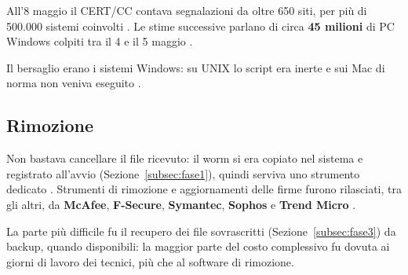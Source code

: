 All'8 maggio il CERT/CC contava segnalazioni da oltre 650 siti, per più di 500.000 sistemi coinvolti \cite{cert2000}. Le stime successive parlano di circa \textbf{45 milioni} di PC Windows colpiti tra il 4 e il 5 maggio \cite{bbc2010}.

Il bersaglio erano i sistemi Windows: su UNIX lo script era inerte e sui Mac di norma non veniva eseguito \cite{bishop2000}.

\subsection{Rimozione}

Non bastava cancellare il file ricevuto: il worm si era copiato nel sistema e registrato all'avvio (Sezione~\ref{subsec:fase1}), quindi serviva uno strumento dedicato \cite{markoff2000, bishop2000}. Strumenti di rimozione e aggiornamenti delle firme furono rilasciati, tra gli altri, da \textbf{McAfee}, \textbf{F-Secure}, \textbf{Symantec}, \textbf{Sophos} e \textbf{Trend Micro} \cite{cert2000}.

La parte più difficile fu il recupero dei file sovrascritti (Sezione~\ref{subsec:fase3}) da backup, quando disponibili: la maggior parte del costo complessivo fu dovuta ai giorni di lavoro dei tecnici, più che al software di rimozione.
